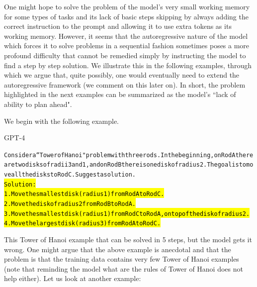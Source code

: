One might hope to solve the problem of the model's very small working memory for some types of tasks and its lack of basic steps skipping by always adding the correct instruction to the prompt and allowing it to use extra tokens as its working memory. However, it seems that the autoregressive nature of the model which forces it to solve problems in a sequential fashion sometimes poses a more profound difficulty that cannot be remedied simply by instructing the model to find a step by step solution. We illustrate this in the following examples, through which we argue that, quite possibly, one would eventually need to extend the autoregressive framework (we comment on this later on). In short, the problem highlighted in the next examples can be summarized as the model's ``lack of ability to plan ahead".

We begin with the following example.

\begin{AIbox}{GPT-4}
\scriptsize
\parbox{1\textwidth}{
\begin{alltt}

Consider a ``Tower of Hanoi" problem with three rods. In the beginning, on Rod A there are two disks of radii 3 and 1, and on Rod B there is one disk of radius 2. The goal is to move all the disks to Rod C. Suggest a solution. \\

\hl{Solution: \\
1. Move the smallest disk (radius 1) from Rod A to Rod C. \\
2. Move the disk of radius 2 from Rod B to Rod A. \\
3. Move the smallest disk (radius 1) from Rod C to Rod A, on top of the disk of radius 2. \\
4. Move the largest disk (radius 3) from Rod A to Rod C.}

\end{alltt}
}
\end{AIbox}

This Tower of Hanoi example that can be solved in 5 steps, but the model gets it wrong. One might argue that the above example is anecdotal and that the problem is that the training data contains very few Tower of Hanoi examples (note that reminding the model what are the rules of Tower of Hanoi does not help either). Let us look at another example:

